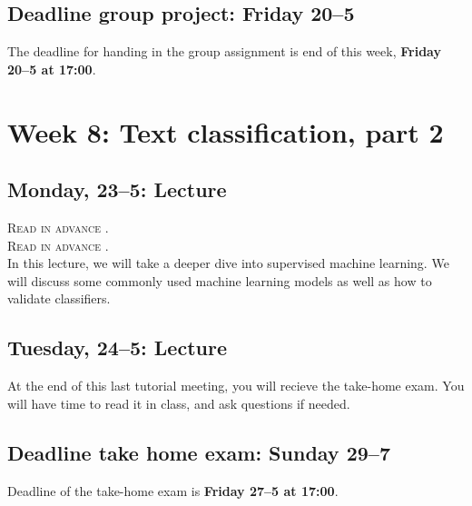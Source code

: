 \subsection*{Deadline group project: Friday 20--5}
The deadline for handing in the group assignment is end of this week, \textbf{Friday 20--5 at 17:00}.

\section*{Week 8: Text classification, part 2}

\subsection*{Monday, 23--5: Lecture}
\textsc{ Read in advance \cite{jordan_mitchell}.} \\
\textsc{ Read in advance \cite{meppelink_reliable_2021}.}\\

In this lecture, we will take a deeper dive into supervised machine learning. We will discuss some commonly used machine learning models as well as how to validate classifiers.

\subsection*{Tuesday, 24--5: Lecture}
At the end of this last tutorial meeting, you will recieve the take-home exam. You will have time to read it in class, and ask questions if needed. \\

\subsection*{Deadline take home exam: Sunday 29--7}
Deadline of the take-home exam is \textbf{Friday 27--5 at 17:00}.







